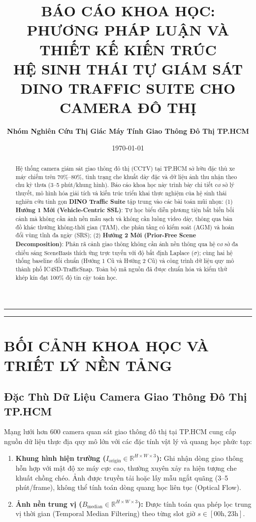 \documentclass[11pt,a4paper]{article}
\title{\textbf{\Large BÁO CÁO KHOA HỌC: PHƯƠNG PHÁP LUẬN VÀ THIẾT KẾ KIẾN TRÚC\\HỆ SINH THÁI TỰ GIÁM SÁT DINO TRAFFIC SUITE CHO CAMERA ĐÔ THỊ}}
\author{\textbf{Nhóm Nghiên Cứu Thị Giác Máy Tính Giao Thông Đô Thị TP.HCM}}
\date{\today}
\begin{document}
\maketitle

\begin{abstract}
Hệ thống camera giám sát giao thông đô thị (CCTV) tại TP.HCM sở hữu đặc thù xe máy chiếm trên 70\%--80\%, tình trạng che khuất dày đặc và dữ liệu ảnh thu nhận theo chu kỳ thưa (3--5 phút/khung hình). Báo cáo khoa học này trình bày chi tiết cơ sở lý thuyết, mô hình hóa giải tích và kiến trúc triển khai thực nghiệm của hệ sinh thái nghiên cứu tinh gọn \textbf{DINO Traffic Suite} tập trung vào các bài toán mũi nhọn: (1) \textbf{Hướng 1 Mới (Vehicle-Centric SSL)}: Tự học biểu diễn phương tiện bất biến bối cảnh mà không cần ảnh nền mẫu sạch và không cần luồng video dày, thông qua bản đồ khác thường không-thời gian (TAM), che phân tầng có kiểm soát (AGM) và hoán đổi vùng tĩnh đa ngày (SRS); (2) \textbf{Hướng 2 Mới (Prior-Free Scene Decomposition)}: Phân rã cảnh giao thông không cần ảnh nền thông qua hệ cơ sở đa chiếu sáng $\text{SceneBasis}$ thích ứng trực tuyến với độ bất định Laplace ($\sigma$); cùng hai hệ thống baseline đối chuẩn (Hướng 1 Cũ và Hướng 2 Cũ) và công trình dữ liệu quy mô thành phố IC4SD-TrafficSnap. Toàn bộ mã nguồn đã được chuẩn hóa và kiểm thử khép kín đạt 100\% độ tin cậy toán học.
\end{abstract}

\hrule
\vspace{1em}

\tableofcontents
\vspace{1em}
\hrule
\vspace{1.5em}

\section{BỐI CẢNH KHOA HỌC VÀ TRIẾT LÝ NỀN TẢNG}

\subsection{Đặc Thù Dữ Liệu Camera Giao Thông Đô Thị TP.HCM}
Mạng lưới hơn 600 camera quan sát giao thông đô thị tại TP.HCM cung cấp nguồn dữ liệu thực địa quy mô lớn với các đặc tính vật lý và quang học phức tạp:
\begin{enumerate}
    \item \textbf{Khung hình hiện trường ($I_{\text{origin}} \in \mathbb{R}^{H \times W \times 3}$):} Ghi nhận dòng giao thông hỗn hợp với mật độ xe máy cực cao, thường xuyên xảy ra hiện tượng che khuất chồng chéo. Ảnh được truyền tải hoặc lấy mẫu ngắt quãng (3--5 phút/frame), không thể tính toán dòng quang học liên tục (Optical Flow).
    \item \textbf{Ảnh nền trung vị ($B_{\text{median}} \in \mathbb{R}^{H \times W \times 3}$):} Được tính toán qua phép lọc trung vị thời gian (Temporal Median Filtering) theo từng slot giờ $s \in [00\text{h}, 23\text{h}]$.
\end{enumerate}
\end{document}
